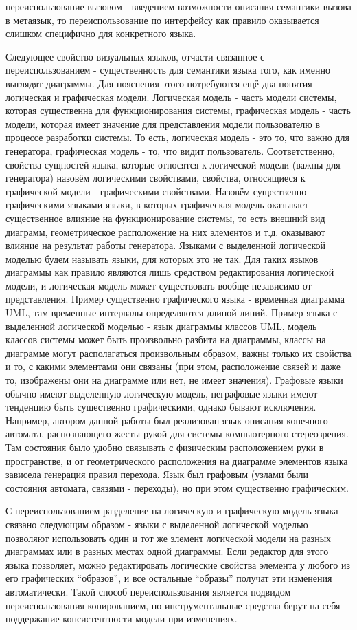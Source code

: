 переиспользование вызовом - введением возможности описания семантики вызова в метаязык, то переиспользование по интерфейсу как правило оказывается слишком специфично для конкретного языка.

Следующее свойство визуальных языков, отчасти связанное с переиспользованием - существенность для семантики языка того, как именно выглядят диаграммы. Для пояснения этого потребуются ещё два понятия - логическая и графическая модели. Логическая модель - часть модели системы, которая существенна для функционирования системы, графическая модель - часть модели, которая имеет значение для представления модели пользователю в процессе разработки системы. То есть, логическая модель - это то, что важно для генератора, графическая модель - то, что видит пользователь. Соответственно, свойства сущностей языка, которые относятся к логической модели (важны для генератора) назовём логическими свойствами, свойства, относящиеся к графической модели - графическими свойствами. Назовём существенно графическими языками языки, в которых графическая модель оказывает существенное влияние на функционирование системы, то есть внешний вид диаграмм, геометрическое расположение на них элементов и т.д. оказывают влияние на результат работы генератора. Языками с выделенной логической моделью будем называть языки, для которых это не так. Для таких языков диаграммы как правило являются лишь средством редактирования логической модели, и логическая модель может существовать вообще независимо от представления. Пример существенно графического языка - временная диаграмма UML, там временные интервалы определяются длиной линий. Пример языка с выделенной логической моделью - язык диаграммы классов UML, модель классов системы может быть произвольно разбита на диаграммы, классы на диаграмме могут располагаться произвольным образом, важны только их свойства и то, с какими элементами они связаны (при этом, расположение связей и даже то, изображены они на диаграмме или нет, не имеет значения). Графовые языки обычно имеют выделенную логическую модель, неграфовые языки имеют тенденцию быть существенно графическими, однако бывают исключения. Например, автором данной работы был реализован язык описания конечного автомата, распознающего жесты рукой для системы компьютерного стереозрения. Там состояния было удобно связывать с физическим расположением руки в пространстве, и от геометрического расположения на диаграмме элементов языка зависела генерация правил перехода. Язык был графовым (узлами были состояния автомата, связями - переходы), но при этом существенно графическим.

С переиспользованием разделение на логическую и графическую модель языка связано следующим образом - языки с выделенной логической моделью позволяют использовать один и тот же элемент логической модели на разных диаграммах или в разных местах одной диаграммы. Если редактор для этого языка позволяет, можно редактировать логические свойства элемента у любого из его графических “образов”, и все остальные “образы” получат эти изменения автоматически. Такой способ переиспользования является подвидом переиспользования копированием, но инструментальные средства берут на себя поддержание консистентности модели при изменениях. 
